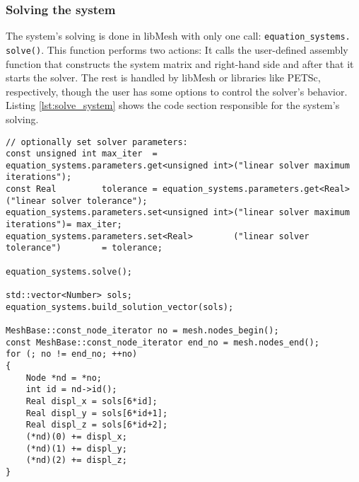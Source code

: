   \subsubsection{Solving the system}\label{sec:Impl-Details-Solving}
  The system's solving is done in libMesh with only one call: %
  \texttt{equation\_systems.\,\!solve()}. This function performs two actions: It calls the user-defined assembly function that constructs the system matrix and right-hand side and after that it starts the solver. The rest is handled by libMesh or libraries like PETSc, respectively, though the user has some options to control the solver's behavior. Listing \ref{lst:solve_system} shows the code section responsible for the system's solving.
\begin{lstlisting}[caption=Solve the system and build solution,label=lst:solve_system,keepspaces=true]
// optionally set solver parameters:
const unsigned int max_iter  = equation_systems.parameters.get<unsigned int>("linear solver maximum iterations");
const Real         tolerance = equation_systems.parameters.get<Real>("linear solver tolerance");
equation_systems.parameters.set<unsigned int>("linear solver maximum iterations")= max_iter;
equation_systems.parameters.set<Real>        ("linear solver tolerance")        = tolerance;

equation_systems.solve();

std::vector<Number> sols;
equation_systems.build_solution_vector(sols);

MeshBase::const_node_iterator no = mesh.nodes_begin();
const MeshBase::const_node_iterator end_no = mesh.nodes_end();
for (; no != end_no; ++no)
{
	Node *nd = *no;
	int id = nd->id();
	Real displ_x = sols[6*id];
	Real displ_y = sols[6*id+1];
	Real displ_z = sols[6*id+2];
	(*nd)(0) += displ_x;
	(*nd)(1) += displ_y;
	(*nd)(2) += displ_z;
}
\end{lstlisting}
